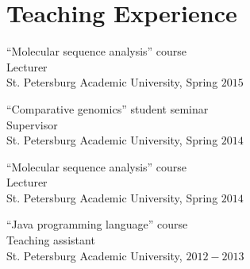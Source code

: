 \blankline

\section{Teaching Experience}
``Molecular sequence analysis'' course\\
Lecturer\\
St. Petersburg Academic University, Spring $2015$

\blankline

``Comparative genomics'' student seminar\\
Supervisor\\
St. Petersburg Academic University, Spring $2014$

\blankline

``Molecular sequence analysis'' course\\
Lecturer\\
St. Petersburg Academic University, Spring $2014$

\blankline

``Java programming language'' course\\
Teaching assistant\\ 
St. Petersburg Academic University, $2012-2013$



